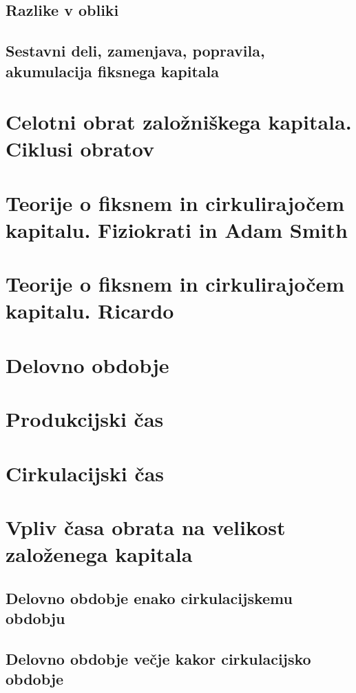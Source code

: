 \documentclass[a5paper]{scrbook}
\begin{document}
\section{Razlike v obliki}

\section{Sestavni deli, zamenjava, popravila, akumulacija fiksnega kapitala}

\chapter{Celotni obrat založniškega kapitala. Ciklusi obratov}

\chapter{Teorije o fiksnem in cirkulirajočem kapitalu. Fiziokrati in Adam Smith}

\chapter{Teorije o fiksnem in cirkulirajočem kapitalu. Ricardo}

\chapter{Delovno obdobje}

\chapter{Produkcijski čas}

\chapter{Cirkulacijski čas}

\chapter{Vpliv časa obrata na velikost založenega kapitala}

\section{Delovno obdobje enako cirkulacijskemu obdobju}

\section{Delovno obdobje večje kakor cirkulacijsko obdobje}
\end{document}
